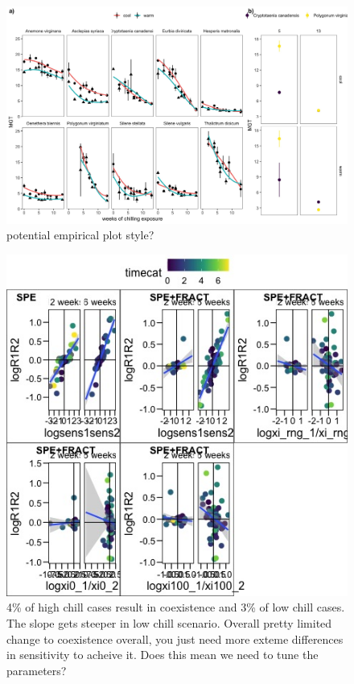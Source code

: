 \documentclass{article}
\begin{document}


\begin{figure}[h!]
  \centering
 \includegraphics[width=\textwidth]{..//plots/empricalplots2.jpeg}
    \caption{potential empirical plot style?}
    \label{Fig:emp}
\end{figure}

\begin{figure}[h!]
  \centering
 \includegraphics[width=\textwidth]{..//plots/coexistance_runner.jpeg}
    \caption{4\% of high chill cases result in coexistence and 3\% of low chill cases. The slope gets steeper in low chill scenario. Overall pretty limited change to coexistence overall, you just need more exteme differences in sensitivity to acheive it. Does this mean we need to tune the parameters?}
    \label{Fig:coexistence}
\end{figure}
\end{document}
